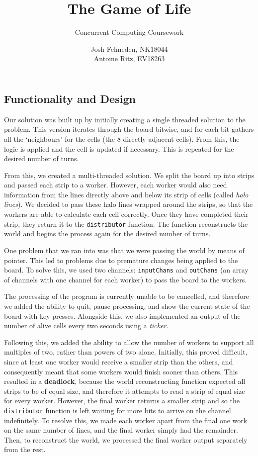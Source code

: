 \documentclass[10pt,a4paper,dvipsnames,cmyk]{scrartcl}
\title{The Game of Life}
\subtitle{Concurrent Computing Coursework}
\author{Josh Felmeden, NK18044 \\ Antoine Ritz, EV18263}
\begin{document}
\maketitle
\begin{multicols}{2}

\section*{Functionality and Design}%
\label{sec:func-and-design}
Our solution was built up by initially creating a single threaded solution
to the problem. This version iterates through the board bitwise, and for
each bit gathers all the `neighbours' for the cells (the 8 directly
adjacent cells). From this, the logic is applied and the cell is updated
if necessary. This is repeated for the desired number of turns.

From this, we created a multi-threaded solution. We split the board up
into strips and passed each strip to a worker. However, each worker would
also need information from the lines directly above and below its strip of
cells (called \textit{halo lines}). We decided to pass these halo lines
wrapped around the strips, so that the workers are able to calculate each
cell correctly. Once they have completed their strip, they return it to
the \texttt{distributor} function. The function reconstructs the world and begins
the process again for the desired number of turns.

One problem that we ran into was that we were passing the world by means
of pointer. This led to problems due to premature changes being applied to
the board. To solve this, we used two channels: \texttt{inputChans} and
\texttt{outChans} (an array of channels with one channel for each worker)
to pass the board to the workers.

The processing of the program is currently unable to be cancelled, and
therefore we added the ability to quit, pause processing, and show the
current state of the board with key presses. Alongside this, we also
implemented an output of the number of alive cells every two seconds using
a \textit{ticker}. 

Following this, we added the ability to allow the number of workers to
support all multiples of two, rather than powers of two alone. Initially,
this proved difficult, since at least one worker would receive a smaller
strip than the others, and consequently meant that some workers would
finish sooner than others. This resulted in a \textbf{deadlock}, because
the world reconstructing function expected all strips to be of equal size,
and therefore it attempts to read a strip of equal size for every worker.
However, the final worker returns a smaller strip and so the
\texttt{distributor} function is left waiting for more bits to arrive on
the channel indefinitely. To resolve this, we made each worker apart
from the final one work on the same number of lines, and the final worker
simply had the remainder. Then, to reconstruct the world, we processed the
final worker output separately from the rest.


\end{multicols}
\end{document}
